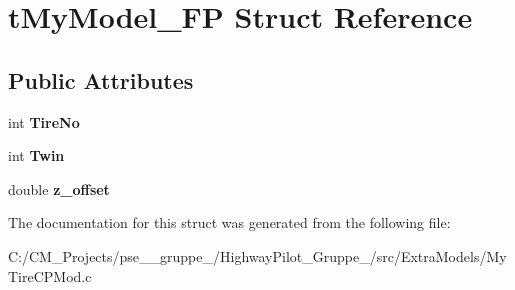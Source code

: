 \hypertarget{structt_my_model___f_p}{}\section{t\+My\+Model\+\_\+\+FP Struct Reference}
\label{structt_my_model___f_p}
\subsection*{Public Attributes}
\begin{DoxyCompactItemize}
\item 
\mbox{\label{structt_my_model___f_p_a3051532e814b52b4d80dae83db9cce3e}} 
int {\bfseries Tire\+No}
\item 
\mbox{\label{structt_my_model___f_p_a36f6377aa8b299737162665150944132}} 
int {\bfseries Twin}
\item 
\mbox{\label{structt_my_model___f_p_adcf9954b174f8c9c02d569d3e3f35622}} 
double {\bfseries z\+\_\+offset}
\end{DoxyCompactItemize}


The documentation for this struct was generated from the following file\+:\begin{DoxyCompactItemize}
\item 
C\+:/\+C\+M\+\_\+\+Projects/pse\+\_\+\_\+gruppe\+\_/\+Highway\+Pilot\+\_\+\+Gruppe\+\_/src/\+Extra\+Models/My\+Tire\+C\+P\+Mod.\+c\end{DoxyCompactItemize}
